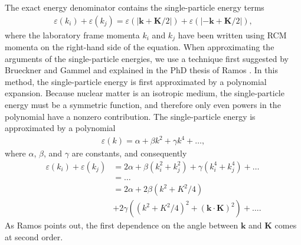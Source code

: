 \documentclass[a4paper,12pt]{report}
\begin{document}
The exact energy denominator contains the single-particle energy terms
\begin{align}
  \varepsilon(k_{i}) + \varepsilon(k_{j}) = \varepsilon(|\mathbf{k}+\mathbf{K}/2|) + \varepsilon(|-\mathbf{k}+\mathbf{K}/2|),
\end{align}
where the laboratory frame momenta $k_{i}$ and $k_{j}$ have been written using RCM momenta on the right-hand side of the equation. When approximating the arguments of the single-particle energies, we use a technique first suggested by 
Brueckner and Gammel \cite{brueckner_gammel} and explained in the PhD thesis of Ramos \cite{ramos_phd,ramos_polls}. In this method, the single-particle energy is first approximated by a polynomial expansion. Because nuclear matter is an isotropic medium, the single-particle energy must be a symmetric function, and therefore only even powers in the polynomial have a nonzero contribution. The single-particle energy is approximated by a polynomial
\begin{align}
  \varepsilon(k) = \alpha + \beta k^{2} + \gamma k^{4} + \dots ,
\end{align}
where $\alpha $, $\beta $, and $\gamma $ are constants, and consequently 
\begin{align}
  \varepsilon(k_{i}) + \varepsilon(k_{j}) &= 2\alpha + \beta (k_{i}^{2} + k_{j}^{2}) + \gamma (k_{i}^{4} + k_{j}^{4}) + \dots \nonumber \\
  & = \dots \nonumber \\
  & = 2\alpha + 2\beta (k^{2} + K^{2}/4) \nonumber \\
  & + 2\gamma \left( (k^{2}+K^{2}/4)^{2} + (\mathbf{k}\cdot \mathbf{K})^{2}\right) + \dots .
\end{align}
As Ramos points out, the first dependence on the angle between $\mathbf{k}$ and $\mathbf{K}$ comes at second order.~\cite{ramos_phd} 
\end{document}
